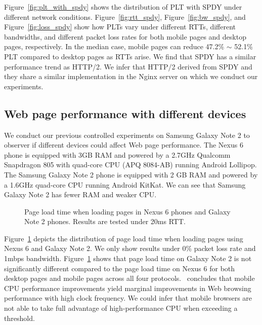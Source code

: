 Figure~\ref{fig:plt_with_spdy} shows the distribution of PLT with SPDY under different network conditions. Figure~\ref{fig:rtt_spdy}, Figure~\ref{fig:bw_spdy}, and Figure~\ref{fig:loss_spdy} show how PLTs vary under different RTTs, different bandwidths, and different packet loss rates for both mobile pages and desktop pages, respectively. In the median case, mobile pages can reduce 47.2\% $\sim$ 52.1\% PLT compared to desktop pages as RTTs arise. We find that SPDY has a similar performance trend as HTTP/2. We infer that HTTP/2 derived from SPDY and they share a similar implementation in the Nginx server on which we conduct our experiments.

\subsection{Web page performance with different devices}

We conduct our previous controlled experiments on Samsung Galaxy Note 2 to observer if different devices could affect Web page performance. The Nexus 6 phone is equipped with 3GB RAM and powered by a 2.7GHz Qualcomm Snapdragon 805 with quad-core CPU (APQ 8084-AB) running Android Lollipop. The Samsung Galaxy Note 2 phone is equipped with 2 GB RAM and powered by a 1.6GHz quad-core CPU running Android KitKat. We can see that Samsung Galaxy Note 2 has fewer RAM and weaker CPU.

\begin{figure}[htbp]
\centering
{}
\caption{Page load time when loading pages in Nexus 6 phones and Galaxy Note 2 phones. Results are tested under 20ms RTT.}
\label{fig:device_pageload}
\end{figure}


Figure~\ref{fig:device_pageload} depicts the distribution of page load time when loading pages using Nexus 6 and Galaxy Note 2. We only show results under 0\% packet loss rate and 1mbps bandwidth. Figure~\ref{fig:device_pageload} shows that page load time on Galaxy Note 2 is not significantly different compared to the page load time on Nexus 6 for both desktop pages and mobile pages across all four protocols.~\cite{Zhu:MICRO15} concludes that mobile CPU performance improvements yield marginal improvements in Web browsing performance with high clock frequency. We could infer that mobile browsers are not able to take full advantage of high-performance CPU when exceeding a threshold.
